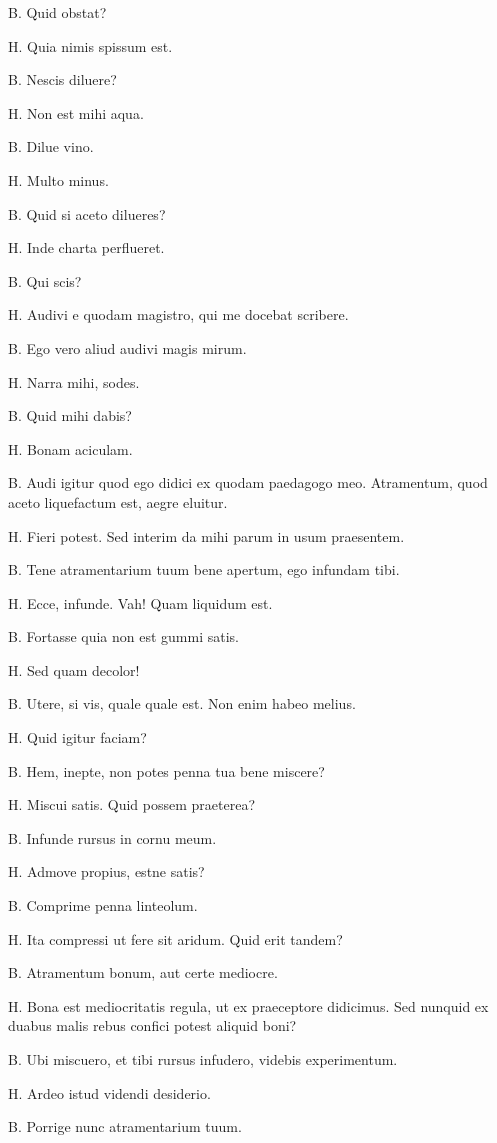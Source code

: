 \documentclass{article}
\begin{document}
B. Quid obstat?

H. Quia nimis spissum est. 

B. Nescis diluere?

H. Non est mihi aqua. 

B. Dilue vino. 

H. Multo minus. 

B. Quid si aceto dilueres?

H. Inde charta perflueret. 

B. Qui scis?

H. Audivi e quodam magistro, qui me docebat scribere. 

B. Ego vero aliud audivi magis mirum. 

H. Narra mihi, sodes. 

B. Quid mihi dabis?

H. Bonam aciculam. 

B. Audi igitur quod ego didici ex quodam paedagogo meo. Atramentum, quod aceto liquefactum est, aegre eluitur.

H. Fieri potest. Sed interim da mihi parum in usum praesentem. 

B. Tene atramentarium tuum bene apertum, ego infundam tibi. 

H. Ecce, infunde. Vah! Quam liquidum est. 

B. Fortasse quia non est gummi satis. 

H. Sed quam decolor!

B. Utere, si vis, quale quale est. Non enim habeo melius. 

H. Quid igitur faciam?

B. Hem, inepte, non potes penna tua bene miscere?

H. Miscui satis. Quid possem praeterea?

B. Infunde rursus in cornu meum. 

H. Admove propius, estne satis?

B. Comprime penna linteolum. 

H. Ita compressi ut fere sit aridum. Quid erit tandem?

B. Atramentum bonum, aut certe mediocre. 

H. Bona est mediocritatis regula, ut ex praeceptore didicimus. Sed nunquid ex duabus malis rebus confici potest aliquid boni?

B. Ubi miscuero, et tibi rursus infudero, videbis experimentum. 

H. Ardeo istud videndi desiderio. 

B. Porrige nunc atramentarium tuum. 
\end{document}
